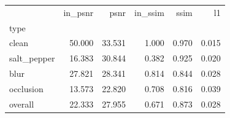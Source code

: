 \begin{tabular}{lrrrrr}
\toprule
 & in_psnr & psnr & in_ssim & ssim & l1 \\
type &  &  &  &  &  \\
\midrule
clean & 50.000 & 33.531 & 1.000 & 0.970 & 0.015 \\
salt_pepper & 16.383 & 30.844 & 0.382 & 0.925 & 0.020 \\
blur & 27.821 & 28.341 & 0.814 & 0.844 & 0.028 \\
occlusion & 13.573 & 22.820 & 0.708 & 0.816 & 0.039 \\
overall & 22.333 & 27.955 & 0.671 & 0.873 & 0.028 \\
\bottomrule
\end{tabular}
